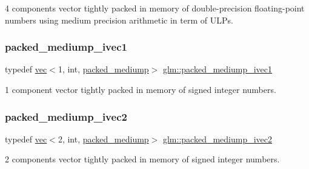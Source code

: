 4 components vector tightly packed in memory of double-\/precision floating-\/point numbers using medium precision arithmetic in term of U\+L\+Ps. 

\mbox{\label{group__gtc__type__aligned_ga2086cbb8b85fe406f4be46fdff491304}} 
\subsubsection{\texorpdfstring{packed\+\_\+mediump\+\_\+ivec1}{packed\_mediump\_ivec1}}
{\footnotesize\ttfamily typedef \mbox{\hyperlink{structglm_1_1vec}{vec}}$<$1, int, \mbox{\hyperlink{namespaceglm_a36ed105b07c7746804d7fdc7cc90ff25a9604654c3b137cd7898689fd34b25bc0}{packed\+\_\+mediump}}$>$ \mbox{\hyperlink{group__gtc__type__aligned_ga2086cbb8b85fe406f4be46fdff491304}{glm\+::packed\+\_\+mediump\+\_\+ivec1}}}



1 component vector tightly packed in memory of signed integer numbers. 

\mbox{\label{group__gtc__type__aligned_ga42af0b51e654d83bd9201e96308942b5}} 
\subsubsection{\texorpdfstring{packed\+\_\+mediump\+\_\+ivec2}{packed\_mediump\_ivec2}}
{\footnotesize\ttfamily typedef \mbox{\hyperlink{structglm_1_1vec}{vec}}$<$2, int, \mbox{\hyperlink{namespaceglm_a36ed105b07c7746804d7fdc7cc90ff25a9604654c3b137cd7898689fd34b25bc0}{packed\+\_\+mediump}}$>$ \mbox{\hyperlink{group__gtc__type__aligned_ga42af0b51e654d83bd9201e96308942b5}{glm\+::packed\+\_\+mediump\+\_\+ivec2}}}



2 components vector tightly packed in memory of signed integer numbers. 

